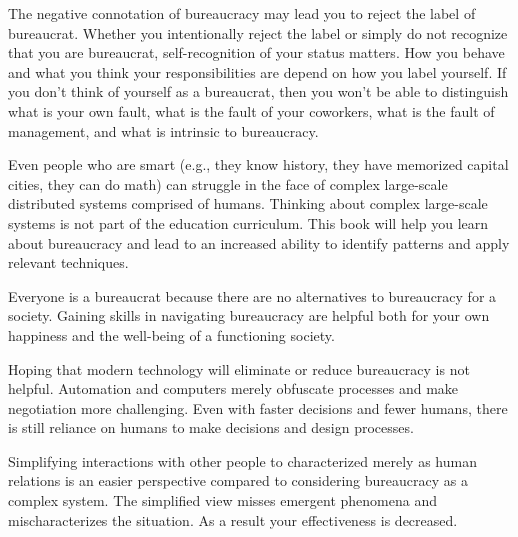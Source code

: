 The negative connotation of bureaucracy may lead you to reject the label of bureaucrat. Whether you intentionally reject the label or simply do not recognize that you are bureaucrat, self-recognition of your status matters. How you behave and what you think your responsibilities are depend on how you label yourself.
If you don't think of yourself as a bureaucrat, then you won't be able to distinguish what is your own fault, what is the fault of your coworkers, what is the fault of management, and what is intrinsic to bureaucracy. 


Even people who are smart (e.g., they know history, they have memorized capital cities, they can do math) can struggle in the face of complex large-scale distributed systems comprised of humans. Thinking about complex large-scale systems is not part of the education curriculum. This book will help you learn about bureaucracy and lead to an increased ability to identify patterns and apply relevant techniques.

Everyone is a bureaucrat because there are no alternatives to bureaucracy for a society. Gaining skills in navigating bureaucracy are helpful both for your own happiness and the well-being of a functioning society. 

Hoping that modern technology will eliminate or reduce bureaucracy is not helpful. Automation and computers merely obfuscate processes and make negotiation more challenging. Even with faster decisions and fewer humans, there is still reliance on humans to make decisions and design processes.

Simplifying interactions with other people to characterized merely as human relations is an easier perspective compared to considering bureaucracy as a complex system.
The simplified view misses emergent phenomena and mischaracterizes the situation. As a result your effectiveness is decreased.





